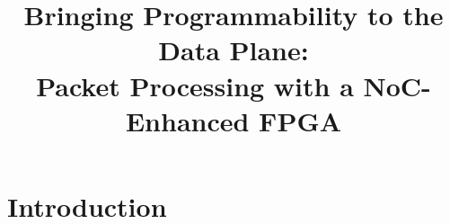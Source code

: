 \documentclass[conference,letterpaper]{IEEEtran}
\newcommand{\abovesectitle}{0pt}
\newcommand{\undersectitle}{0pt}
\renewcommand{\abovesectitle}{-4pt}
\renewcommand{\undersectitle}{-4pt}
\begin{document}
\newcommand{\figfull}[4]{\begin{figure*}[!t]
\centering
\texttt{[image: figs/\#2]}
\caption{#4}
\label{#2}
\end{figure*}}

\newcommand{\figp}[4]{\begin{figure}[#4]
\centering
\texttt{[image: figs/\#1]}
\caption{#3}
\label{#1}
\end{figure}}

\newcommand{\subsubsubsection}[1]{\vspace{0.2cm}\noindent\textbf{\textit{#1:}}}




\title{Bringing Programmability to the Data Plane: \\ Packet Processing with a NoC-Enhanced FPGA} 



\author{
}




\maketitle


%
%
\begin{abstract}

\end{abstract}
%
%
%
\vspace{\abovesectitle}
\section{Introduction}
\vspace{\undersectitle}
%

%
%
\vspace{\abovesectitle}
\end{document}
